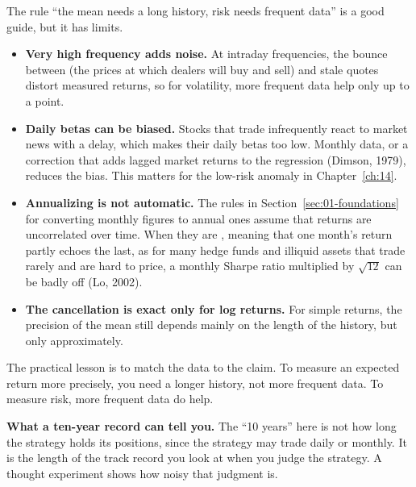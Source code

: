 \begin{technote}
The rule ``the mean needs a long history, risk needs frequent data'' is a good guide, but it has limits.
\begin{itemize}
  \item \textbf{Very high frequency adds noise.} At intraday frequencies, the bounce between  (the prices at which dealers will buy and sell) and stale quotes distort measured returns, so for volatility, more frequent data help only up to a point.
  \item \textbf{Daily betas can be biased.} Stocks that trade infrequently react to market news with a delay, which makes their daily betas too low. Monthly data, or a correction that adds lagged market returns to the regression (Dimson, 1979), reduces the bias. This matters for the low-risk anomaly in Chapter~\ref{ch:14}.
  \item \textbf{Annualizing is not automatic.} The rules in Section~\ref{sec:01-foundations} for converting monthly figures to annual ones assume that returns are uncorrelated over time. When they are , meaning that one month's return partly echoes the last, as for many hedge funds and illiquid assets that trade rarely and are hard to price, a monthly Sharpe ratio multiplied by $\sqrt{12}$ can be badly off (Lo, 2002).
  \item \textbf{The cancellation is exact only for log returns.} For simple returns, the precision of the mean still depends mainly on the length of the history, but only approximately.
\end{itemize}
\end{technote}

The practical lesson is to match the data to the claim. To measure an expected return more precisely, you need a longer history, not more frequent data. To measure risk, more frequent data do help.

\textbf{What a ten-year record can tell you.} The ``10 years'' here is not how long the strategy holds its positions, since the strategy may trade daily or monthly. It is the length of the track record you look at when you judge the strategy. A thought experiment shows how noisy that judgment is.

